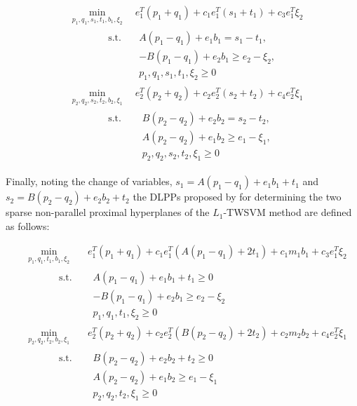 \documentclass[12pt]{report} %
\begin{document}
\begin{subequations}
\begin{align}
& \min_{p_1,q_1,s_1,t_1,b_1,\xi_2} \quad e_1^T(p_1 + q_1) + c_1e_1^T(s_1 + t_1) + c_3e_1^T\xi_2 \\
& \quad \quad \quad \;\;\begin{aligned}
\text{s.t.} \quad 
& A(p_1 - q_1) + e_1b_1 = s_1 - t_1, \\
& -B(p_1 - q_1) + e_2b_1 \geq e_2 - \xi_2, \\
& p_1, q_1, s_1, t_1, \xi_2 \geq 0
\nonumber \end{aligned}
\\[2ex]
& \min_{p_2,q_2,s_2,t_2,b_2,\xi_1} \quad e_2^T(p_2 + q_2) + c_2e_2^T(s_2 + t_2) + c_4e_2^T\xi_1 \\
& \quad \quad \quad \;\;\begin{aligned}
\text{s.t. } \quad 
& B(p_2 - q_2) + e_2b_2 = s_2 - t_2, \\
& A(p_2 - q_2) + e_1b_2 \geq e_1 - \xi_1, \\
& p_2, q_2, s_2, t_2, \xi_1 \geq 0
\nonumber \end{aligned}
\end{align}
\end{subequations}

Finally, noting the change of variables, $s_1 = A(p_1 - q_1) + e_1b_1 + t_1$ and $s_2 = B(p_2 - q_2) + e_2b_2 + t_2$ the DLPPs proposed by \cite{bai2014novel} for determining the two sparse non-parallel proximal hyperplanes of the $L_1$-TWSVM method are defined as follows:

\begin{subequations}
\label{eq:final_l1_twsvm}
\begin{align}
& \min_{p_1,q_1,t_1,b_1,\xi_2} \quad\;\;  e_1^T(p_1+q_1) + c_1e_1^T(A(p_1 -q_1) + 2t_1) + c_1m_1b_1 + c_3e_1^T\xi_2 \\
& \quad \quad \quad
\begin{aligned}
\text{s.t. } \quad
& A(p_1 - q_1) + e_1b_1 + t_1 \geq 0 \\
& -B(p_1-q_1) + e_2b_1 \geq e_2 - \xi_2 \\
& p_1, q_1, t_1, \xi_2 \geq 0 
\nonumber \end{aligned}
\nonumber\\[1ex]
& \min_{p_2,q_2,t_2,b_2,\xi_1} \quad\;\; e_2^T(p_2 + q_2) + c_2e_2^T(B(p_2 - q_2) + 2t_2) + c_2m_2b_2 + c_4e_2^T\xi_1 \\
& \quad \quad \quad
\begin{aligned}
\text{s.t. } \quad
& B(p_2-q_2) + e_2b_2 + t_2 \geq 0 \\
& A(p_2-q_2) + e_1b_2 \geq e_1 - \xi_1 \\
& p_2,q_2,t_2,\xi_1 \geq 0
\nonumber \end{aligned}
\end{align}
\end{subequations}
\end{document}

